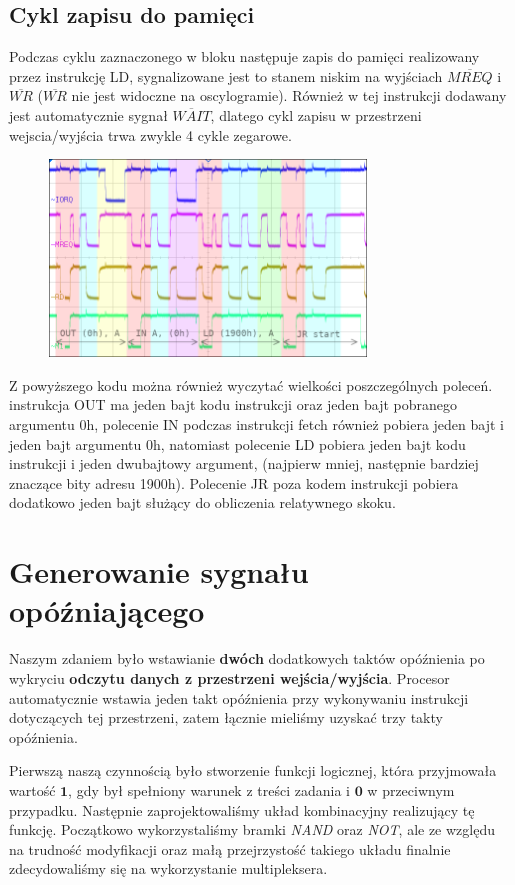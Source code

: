 \documentclass[fleqn]{article}
\newcommand\square[1]{
	\fcolorbox{black}{#1}{\rule{0pt}{6pt}\rule{6pt}{0pt}}
}
\begin{document}
\subsection{Cykl zapisu do pamięci}
Podczas cyklu zaznaczonego w bloku \square{green} następuje zapis do pamięci realizowany przez instrukcję LD, sygnalizowane jest to stanem niskim na wyjściach $\overline{MREQ}$ i $\overline{WR}$ ($\overline{WR}$ nie jest widoczne na oscylogramie). Również w tej instrukcji dodawany jest automatycznie sygnał $\overline{WAIT}$, dlatego cykl zapisu w przestrzeni wejscia/wyjścia trwa zwykle 4 cykle zegarowe.

\begin{figure}[H]
	\centering
	\includegraphics[width=0.75\textwidth]{img/1a.png}
	\caption{}
\end{figure}

Z powyższego kodu można również wyczytać wielkości poszczególnych poleceń. instrukcja OUT ma jeden bajt kodu instrukcji oraz jeden bajt pobranego argumentu 0h, polecenie IN podczas instrukcji fetch również pobiera jeden bajt i jeden bajt argumentu 0h, natomiast polecenie LD pobiera jeden bajt kodu instrukcji i jeden dwubajtowy argument, (najpierw mniej, następnie bardziej znaczące bity adresu 1900h). Polecenie JR poza kodem instrukcji pobiera dodatkowo jeden bajt służący do obliczenia relatywnego skoku.

\section{Generowanie sygnału opóźniającego}
Naszym zdaniem było wstawianie \textbf{dwóch} dodatkowych taktów opóźnienia po wykryciu \textbf{odczytu danych z przestrzeni wejścia/wyjścia}. Procesor automatycznie wstawia jeden takt opóźnienia przy wykonywaniu instrukcji dotyczących tej przestrzeni, zatem łącznie mieliśmy uzyskać trzy takty opóźnienia.

Pierwszą naszą czynnością było stworzenie funkcji logicznej, która przyjmowała wartość $\textbf{1}$, gdy był spełniony warunek z treści zadania i $\textbf{0}$ w przeciwnym przypadku. Następnie zaprojektowaliśmy układ kombinacyjny realizujący tę funkcję. Początkowo wykorzystaliśmy bramki \textit{NAND} oraz \textit{NOT}, ale ze względu na trudność modyfikacji oraz małą przejrzystość takiego układu finalnie zdecydowaliśmy się na wykorzystanie multipleksera.
\end{document}
